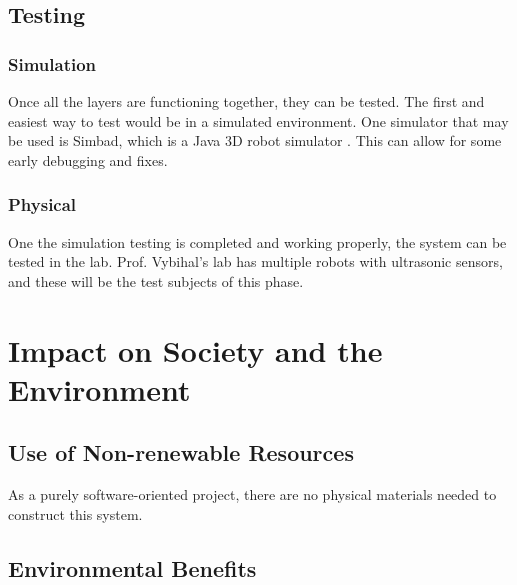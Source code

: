 \documentclass[titlepage,11pt]{article}
\begin{document}
\subsection{Testing}

\subsubsection{Simulation}

Once all the layers are functioning together, they can be tested. The first and easiest way to test would be in a simulated environment. One simulator that may be used is Simbad, which is a Java 3D robot simulator \cite{simbad}. This can allow for some early debugging and fixes.

\subsubsection{Physical}

One the simulation testing is completed and working properly, the system can be tested in the lab. Prof. Vybihal's lab has multiple robots with ultrasonic sensors, and these will be the test subjects of this phase.

\section{Impact on Society and the Environment}


\subsection{Use of Non-renewable Resources}

As a purely software-oriented project, there are no physical materials needed to construct this system.

\subsection{Environmental Benefits}
\end{document}
